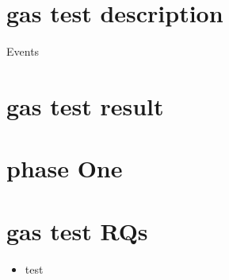 \documentclass{report}
\begin{document}
\chapter{gas test description}

Events

\begin{itemize}
	
\end{itemize}
\chapter{gas test result}

\begin{itemize}
	
\end{itemize}
\appendix
\chapter{phase One}

\chapter {gas test RQs}
\begin{itemize}
	\item test
\end{itemize}
\end{document}

